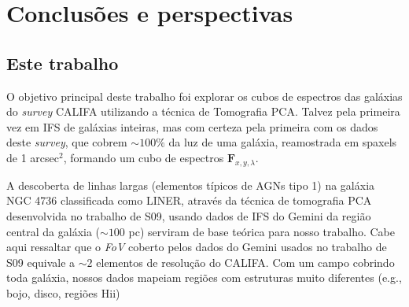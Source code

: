 


\chapter{Conclusões e perspectivas}
\label{sec:conclusao}


\section{Este trabalho}

O objetivo principal deste trabalho foi explorar os cubos de espectros das galáxias do {\em survey} CALIFA utilizando a
técnica de Tomografia PCA. Talvez pela primeira vez em IFS de galáxias inteiras, mas com certeza pela primeira com os
dados deste {\em survey}, que cobrem $\sim100\%$ da luz de uma galáxia, reamostrada em spaxels de 1 arcsec$^2$, formando
um cubo de espectros $\mathbf{F}_{x,y,\lambda}$.

A descoberta de linhas largas (elementos típicos de AGNs tipo 1) na galáxia NGC 4736 classificada como LINER, através da
técnica de tomografia PCA desenvolvida no trabalho de S09, usando dados de IFS do Gemini da região central da galáxia
($\sim100$ pc) serviram de base teórica para nosso trabalho. Cabe aqui ressaltar que o {\em FoV} coberto pelos dados do
Gemini usados no trabalho de S09 equivale a $\sim2$ elementos de resolução do CALIFA. Com um campo cobrindo toda
galáxia, nossos dados mapeiam regiões com estruturas muito diferentes (e.g., bojo, disco, regiões H{\sc ii})    

